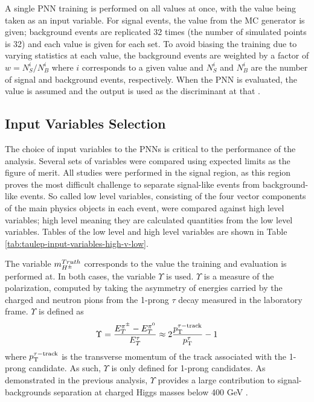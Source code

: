 			A single \gls{PNN} training is performed on all \mHpm values at once, with the \mHpm value being taken as an input variable. For signal events, the \mHpm value from the \gls{MC} generator is given; background events are replicated 32 times (the number of simulated \mHpm points is 32) and each \mHpm value is given for each set. To avoid biasing the training due to varying statistics at each \mHpm value, the background events are weighted by a factor of $w = N^{i}_{S}/N^{i}_{B}$ where $i$ corresponds to a given \mHpm value and $N^{i}_{S}$ and $N^{i}_{B}$ are the number of signal and background events, respectively. When the \gls{PNN} is evaluated, the \mHpm value is assumed and the output is used as the discriminant at that \mHpm.

		\subsection{Input Variables Selection}\label{ssec:input-variables}
			The choice of input variables to the \glspl{PNN} is critical to the performance of the analysis. Several sets of variables were compared using expected limits as the figure of merit. All studies were performed in the \taulep signal region, as this region proves the most difficult challenge to separate signal-like events from background-like events. So called low level variables, consisting of the four vector components of the main physics objects in each event, were compared against high level variables; high level meaning they are calculated quantities from the low level variables. Tables of the low level and high level variables are shown in Table \ref{tab:taulep-input-variables-high-v-low}. 

			The variable $m_{H^{\pm}}^{Truth}$ corresponds to the \mHpm value the training and evaluation is performed at. In both cases, the variable $\Upsilon$ is used. $\Upsilon$ is a measure of the \tauhad polarization, computed by taking the asymmetry of energies carried by the charged and neutron pions from the 1-prong $\tau$ decay measured in the laboratory frame. $\Upsilon$ is defined as
			\begin{equation}\label{eqn:upsilon}
			\Upsilon = \frac{ E^{\pi^{\pm}}_{T} - E^{\pi^{0}}_{T}}{E^{\tau}_{T}} \approx 2 \frac{p_{\text{T}}^{\tau-\mathrm{track}}}{p_{\text{T}}^{\tau}} -1
			\end{equation}
			where $p_{\text{T}}^{\tau-\mathrm{track}}$ is the transverse momentum of the track associated with the 1-prong \tauhad candidate. As such, $\Upsilon$ is only defined for 1-prong \tauhad candidates. As demonstrated in the previous analysis, $\Upsilon$ provides a large contribution to signal-backgrounds separation at charged Higgs masses below 400 GeV \cite{hpm-previous}.

